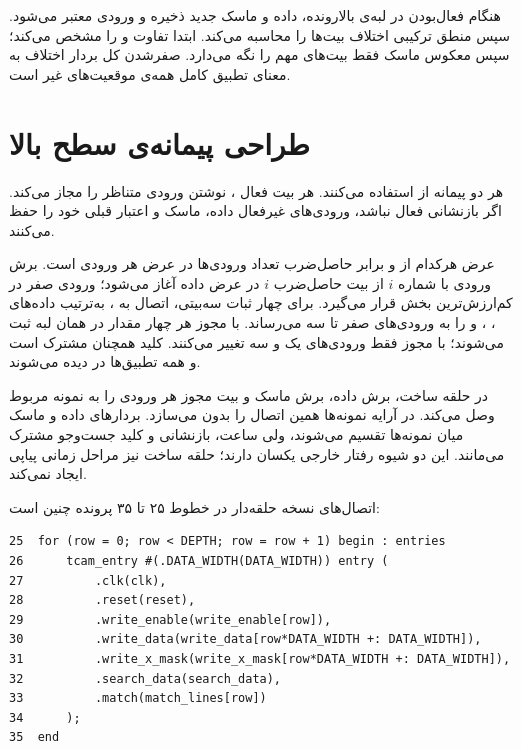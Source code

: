 هنگام فعال‌بودن  در لبه‌ی بالارونده، داده و ماسک جدید ذخیره و ورودی
معتبر می‌شود. سپس منطق ترکیبی اختلاف بیت‌ها را محاسبه می‌کند. ابتدا  تفاوت
 و  را مشخص می‌کند؛ سپس معکوس ماسک فقط بیت‌های مهم
را نگه می‌دارد. صفرشدن کل بردار اختلاف به معنای تطبیق کامل همه‌ی موقعیت‌های غیر  است.

\section{طراحی پیمانه‌ی سطح بالا}

هر دو پیمانه از  استفاده می‌کنند. هر بیت فعال ،
نوشتن ورودی متناظر را مجاز می‌کند. اگر بازنشانی فعال نباشد، ورودی‌های غیرفعال داده،
ماسک و اعتبار قبلی خود را حفظ می‌کنند.

عرض هرکدام از  و  برابر حاصل‌ضرب تعداد ورودی‌ها در عرض هر ورودی است. برش ورودی با شماره $i$ از بیت حاصل‌ضرب $i$ در عرض داده آغاز می‌شود؛ ورودی صفر در کم‌ارزش‌ترین بخش قرار می‌گیرد. برای چهار ثبات سه‌بیتی، اتصال  به ، به‌ترتیب داده‌های ، ،  و  را به ورودی‌های صفر تا سه می‌رساند. با مجوز  هر چهار مقدار در همان لبه ثبت می‌شوند؛ با مجوز  فقط ورودی‌های یک و سه تغییر می‌کنند. کلید  همچنان مشترک است و همه تطبیق‌ها در  دیده می‌شوند.

در  حلقه ساخت، برش داده، برش ماسک و بیت مجوز هر ورودی را به نمونه مربوط وصل می‌کند. در  آرایه نمونه‌ها همین اتصال را بدون  می‌سازد. بردارهای داده و ماسک میان نمونه‌ها تقسیم می‌شوند، ولی ساعت، بازنشانی و کلید جست‌وجو مشترک می‌مانند. این دو شیوه رفتار خارجی یکسان دارند؛ حلقه ساخت نیز مراحل زمانی پیاپی ایجاد نمی‌کند.

اتصال‌های نسخه حلقه‌دار در خطوط ۲۵ تا ۳۵ پرونده  چنین است:

\begin{dsdlcodeblock}
\begin{verbatim}
25  for (row = 0; row < DEPTH; row = row + 1) begin : entries
26      tcam_entry #(.DATA_WIDTH(DATA_WIDTH)) entry (
27          .clk(clk),
28          .reset(reset),
29          .write_enable(write_enable[row]),
30          .write_data(write_data[row*DATA_WIDTH +: DATA_WIDTH]),
31          .write_x_mask(write_x_mask[row*DATA_WIDTH +: DATA_WIDTH]),
32          .search_data(search_data),
33          .match(match_lines[row])
34      );
35  end
\end{verbatim}
\end{dsdlcodeblock}

